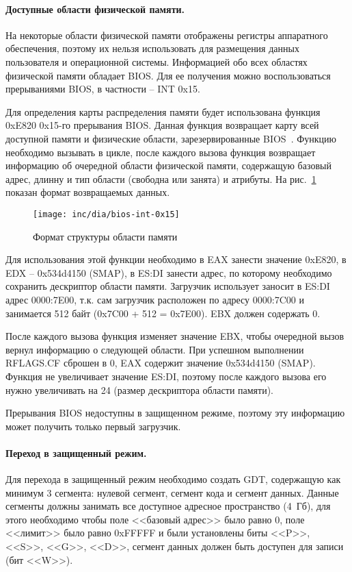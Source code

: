 \paragraph{Доступные области физической памяти.} На некоторые области физической памяти
отображены регистры аппаратного обеспечения, поэтому их нельзя использовать для размещения
данных пользователя и операционной системы. Информацией обо всех областях физической памяти
обладает BIOS. Для ее получения можно воспользоваться прерываниями BIOS, в частности -- INT 0x15.

Для определения карты распределения памяти будет использована функция 0xE820 0x15-го прерывания
BIOS. Данная функция возвращает карту всей доступной памяти и физические области, зарезервированные
BIOS~\cite{bios_int15h}. Функцию необходимо вызывать в цикле, после каждого вызова функция возвращает
информацию об очередной области физической памяти, содержащую базовый адрес, длинну и тип области
(свободна или занята) и атрибуты. На рис.~\ref{fig:bios-int-0x15} показан формат возвращаемых данных.

\begin{figure}[ht!]
  \centering
  \texttt{[image: inc/dia/bios-int-0x15]}
  \caption{Формат структуры области памяти}
  \label{fig:bios-int-0x15}
\end{figure}

Для использования этой функции необходимо в EAX занести значение 0xE820, в EDX -- 0x534d4150 (SMAP),
в ES:DI занести адрес, по которому необходимо сохранить дескриптор области памяти. Загрузчик
использует заносит в ES:DI адрес 0000:7E00, т.к. сам загрузчик расположен по адресу 0000:7C00 и
занимается 512 байт (0x7C00 + 512 = 0x7E00). EBX должен содержать 0.

После каждого вызова функция изменяет значение EBX, чтобы очередной вызов вернул информацию о следующей
области. При успешном выполнении RFLAGS.CF сброшен в 0, EAX содержит значение 0x534d4150 (SMAP).
Функция не увеличивает значение ES:DI, поэтому после каждого вызова его нужно увеличивать на 24 (размер
дескриптора области памяти).

Прерывания BIOS недоступны в защищенном режиме, поэтому эту информацию может получить только первый загрузчик.

\paragraph{Переход в защищенный режим.} Для перехода в защищенный режим необходимо создать GDT,
содержащую как минимум 3 сегмента: нулевой сегмент, сегмент кода и сегмент данных. Данные сегменты
должны занимать все доступное адресное пространство (4~Гб), для этого необходимо чтобы поле
<<базовый адрес>> было равно 0, поле <<лимит>> было равно 0xFFFFF и были установлены биты
<<P>>, <<S>>, <<G>>, <<D>>, сегмент данных должен быть доступен для записи (бит <<W>>).

